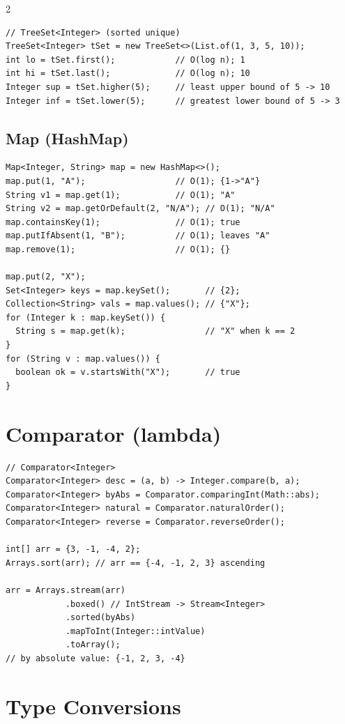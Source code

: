 \documentclass{article}
\begin{document}
\begin{multicols}{2}
\begin{lstlisting}
// TreeSet<Integer> (sorted unique)
TreeSet<Integer> tSet = new TreeSet<>(List.of(1, 3, 5, 10));
int lo = tSet.first();            // O(log n); 1
int hi = tSet.last();             // O(log n); 10
Integer sup = tSet.higher(5);     // least upper bound of 5 -> 10
Integer inf = tSet.lower(5);      // greatest lower bound of 5 -> 3
\end{lstlisting}

\subsection{Map (HashMap)}
\begin{lstlisting}
Map<Integer, String> map = new HashMap<>();
map.put(1, "A");                  // O(1); {1->"A"}
String v1 = map.get(1);           // O(1); "A"
String v2 = map.getOrDefault(2, "N/A"); // O(1); "N/A"
map.containsKey(1);               // O(1); true
map.putIfAbsent(1, "B");          // O(1); leaves "A"
map.remove(1);                    // O(1); {}

map.put(2, "X");
Set<Integer> keys = map.keySet();       // {2};
Collection<String> vals = map.values(); // {"X"};
for (Integer k : map.keySet()) {
  String s = map.get(k);                // "X" when k == 2
}
for (String v : map.values()) {
  boolean ok = v.startsWith("X");       // true
}
\end{lstlisting}




\columnbreak
\section{Comparator (lambda)}

\begin{lstlisting}
// Comparator<Integer>
Comparator<Integer> desc = (a, b) -> Integer.compare(b, a);
Comparator<Integer> byAbs = Comparator.comparingInt(Math::abs);
Comparator<Integer> natural = Comparator.naturalOrder();
Comparator<Integer> reverse = Comparator.reverseOrder();

int[] arr = {3, -1, -4, 2};
Arrays.sort(arr); // arr == {-4, -1, 2, 3} ascending

arr = Arrays.stream(arr)
            .boxed() // IntStream -> Stream<Integer>
            .sorted(byAbs)
            .mapToInt(Integer::intValue)
            .toArray();
// by absolute value: {-1, 2, 3, -4}
\end{lstlisting}

\section{Type Conversions}


\end{multicols}
\end{document}
